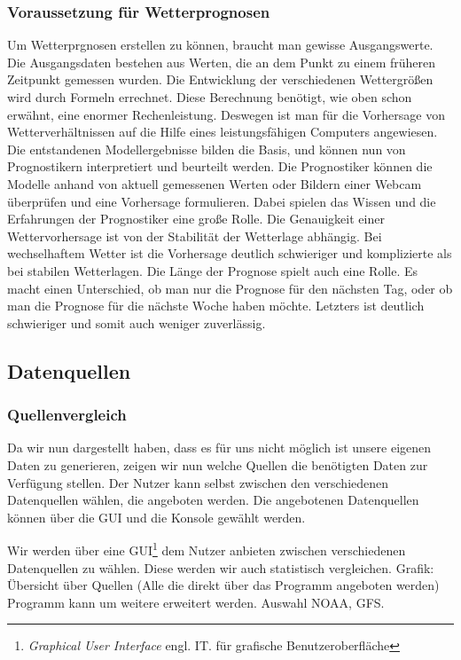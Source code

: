 \subsubsection{Voraussetzung für Wetterprognosen} %
Um Wetterprgnosen erstellen zu können, braucht man gewisse Ausgangswerte.
Die Ausgangsdaten bestehen aus Werten,
die an dem Punkt zu einem früheren Zeitpunkt gemessen wurden.
Die Entwicklung der verschiedenen Wettergrößen wird durch Formeln errechnet.
Diese Berechnung benötigt, wie oben schon erwähnt, eine enormer Rechenleistung.
Deswegen ist man für die Vorhersage von Wetterverhältnissen auf die Hilfe eines leistungsfähigen Computers angewiesen.
Die entstandenen Modellergebnisse bilden die Basis, und können nun von Prognostikern interpretiert und beurteilt werden.
Die Prognostiker können die Modelle anhand von aktuell gemessenen Werten oder Bildern einer Webcam überprüfen und eine Vorhersage formulieren.
Dabei spielen das Wissen und die Erfahrungen der Prognostiker eine große Rolle.
Die Genauigkeit einer Wettervorhersage ist von der Stabilität der Wetterlage abhängig.
Bei wechselhaftem Wetter ist die Vorhersage deutlich schwieriger und komplizierte als bei stabilen Wetterlagen.
Die Länge der Prognose spielt auch eine Rolle.
Es macht einen Unterschied,
ob man nur die Prognose für den nächsten Tag,
oder ob man die Prognose für die nächste Woche haben möchte.
Letzters ist deutlich schwieriger und somit auch weniger zuverlässig.

\subsection{Datenquellen} %

\subsubsection{Quellenvergleich} %
Da wir nun dargestellt haben, dass es für uns nicht möglich ist unsere eigenen Daten zu generieren, zeigen wir nun welche Quellen die benötigten Daten zur Verfügung stellen.
Der Nutzer kann selbst zwischen den verschiedenen Datenquellen wählen, die angeboten werden.
Die angebotenen Datenquellen können über die GUI und die Konsole gewählt werden.

Wir werden über eine GUI\footnote{\textit{Graphical User Interface} engl. IT. für grafische Benutzeroberfläche} dem Nutzer anbieten zwischen verschiedenen Datenquellen zu wählen.
Diese werden wir auch statistisch vergleichen.
Grafik: Übersicht über Quellen (Alle die direkt über das Programm angeboten werden)
Programm kann um weitere erweitert werden.
Auswahl NOAA, GFS.\cite{noaa}


